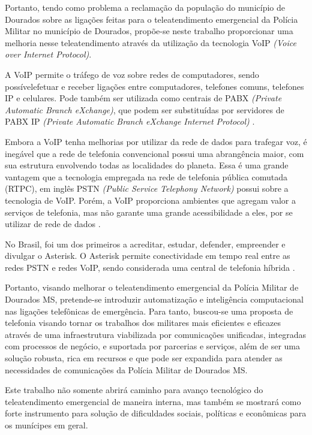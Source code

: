 Portanto, tendo como problema a reclamação da população do município de Dourados sobre as ligações feitas para o teleatendimento emergencial da Polícia Militar no município de Dourados, propõe-se neste trabalho proporcionar uma melhoria nesse teleatendimento através da utilização da tecnologia VoIP \textit{(Voice over Internet Protocol)}. 

A VoIP permite o tráfego de voz sobre redes de computadores, sendo possívelefetuar e receber ligações entre computadores, telefones comuns, telefones IP e celulares. Pode também ser utilizada como centrais de PABX \textit{(Private Automatic Branch eXchange)}, que podem ser substituídas por servidores de PABX IP \textit{(Private Automatic Branch eXchange Internet Protocol)} \cite{glauciadasilvaribeiro2011}.

Embora a VoIP tenha melhorias por utilizar da rede de dados para trafegar voz, é inegável que a rede de telefonia convencional possui uma abrangência maior, com sua estrutura envolvendo todas as localidades do planeta. Essa é uma grande vantagem que a tecnologia empregada na rede de telefonia pública comutada (RTPC), em inglês PSTN \textit{(Public Service Telephony Network)} possui sobre a tecnologia de VoIP. Porém, a VoIP proporciona ambientes que agregam valor a serviços de telefonia, mas não garante uma grande acessibilidade a eles, por se utilizar de rede de dados \cite{theodorewallingford2005}.

No Brasil,  foi um dos primeiros a acreditar, estudar, defender, empreender e divulgar o Asterisk. O Asterisk permite conectividade em tempo real entre as redes PSTN e redes VoIP, sendo considerada uma central de telefonia híbrida \cite{alexandrekeller2014}.

Portanto, visando melhorar o teleatendimento emergencial da Polícia Militar de Dourados MS, pretende-se introduzir automatização e inteligência computacional nas ligações telefônicas de emergência. Para tanto, buscou-se uma proposta de telefonia visando tornar os trabalhos dos militares mais eficientes e eficazes através de uma infraestrutura viabilizada por comunicações unificadas, integradas com processos de negócio, e suportada por parcerias e serviços, além de ser uma solução robusta, rica em recursos e que pode ser expandida para atender as necessidades de comunicações da Polícia Militar de Dourados MS.

Este trabalho não somente abrirá caminho para avanço tecnológico do teleatendimento emergencial de maneira interna, mas também se mostrará como forte instrumento para solução de dificuldades sociais, políticas e econômicas para os munícipes em geral.

